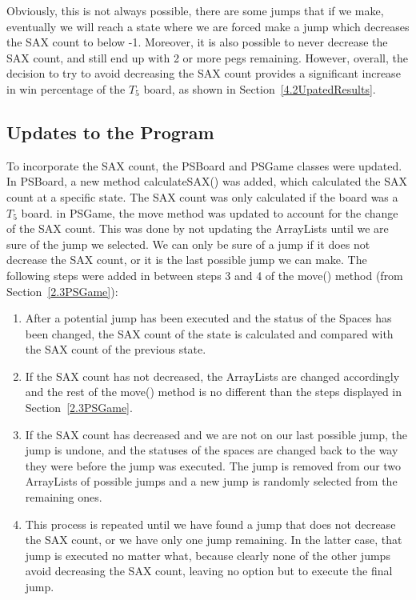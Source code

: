 \documentclass{article}
\begin{document}
Obviously, this is not always possible, there are some jumps that if we make, eventually we will reach a state where we are forced make a jump which decreases the SAX count to below -1. Moreover, it is also possible to never decrease the SAX count, and still end up with 2 or more pegs remaining. However, overall, the decision to try to avoid decreasing the SAX count provides a significant increase in win percentage of the $T_5$ board, as shown in Section~\ref{4.2UpatedResults}. 
\subsection{Updates to the Program}
\label{4.1ProgramUpdates}
To incorporate the SAX count, the PSBoard and PSGame classes were updated. In PSBoard, a new method calculateSAX() was added, which calculated the SAX count at a specific state. The SAX count was only calculated if the board was a $T_5$ board. in PSGame, the move method was updated to account for the change of the SAX count. This was done by not updating the ArrayLists until we are sure of the jump we selected. We can only be sure of a jump if it does not decrease the SAX count, or it is the last possible jump we can make. The following steps were added in between steps 3 and 4 of the move() method (from Section~\ref{2.3PSGame}):
\begin{enumerate}

\item After a potential jump has been executed and the status of the Spaces has been changed, the SAX count of the state is calculated and compared with the SAX count of the previous state.
\item If the SAX count has not decreased, the ArrayLists are changed accordingly and the rest of the move() method is no different than the steps displayed in Section~\ref{2.3PSGame}.
\item If the SAX count has decreased and we are not on our last possible jump, the jump is undone, and the statuses of the spaces are changed back to the way they were before the jump was executed. The jump is removed from our two ArrayLists of possible jumps and a new jump is randomly selected from the remaining ones.
\item This process is repeated until we have found a jump that does not decrease the SAX count, or we have only one jump remaining. In the latter case, that jump is executed no matter what, because clearly none of the other jumps avoid decreasing the SAX count, leaving no option but to execute the final jump.
\end{enumerate}
\end{document}
